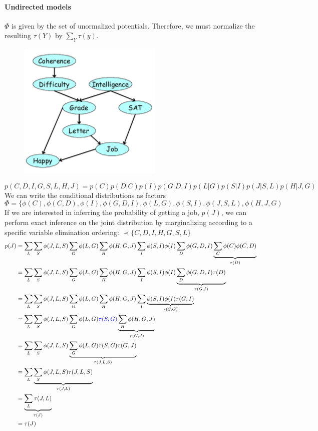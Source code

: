 \documentclass[11pt]{article}
\begin{document}
\paragraph{Undirected models}
$\Phi$ is given by the set of unormalized potentials. Therefore, we must normalize the resulting $\tau(Y)$ by $\sum_Y \tau(y)$.

 \begin{figure}[H]
	\centering
	\includegraphics[scale=0.6]{p1.png}
\end{figure}
$$p(C, D, I, G, S, L, H, J) = p(C)p(D|C)p(I)p(G|D,I)p(L|G)p(S|I)p(J|S,L)p(H|J,G)$$
We can write the conditional distributions as factors
$$\Phi = \{\phi(C), \phi(C, D), \phi(I), \phi(G,D,I), \phi(L,G), \phi(S, I), \phi(J, S, L), \phi(H, J, G)$$
If we are interested in inferring the probability of getting a job, $p(J)$, we can perform exact inference on the joint distribution by marginalizing according to a specific variable elimination ordering: $    \prec \{C, D, I, H, G, S, L\}$
\begin{align*}
	p(J) &=\sum_{L}\sum_{S} \phi(J,L,S) \sum_{G} \phi(L, G) \sum_{H}\phi(H,G,J)\sum_I \phi(S, I)\phi(I)\sum_D\phi(G,D,I)\underbrace{\sum_C\phi(C)\phi(C,D)}_{\tau{(D)}} \\
		 &=\sum_{L}\sum_{S} \phi(J,L,S) \sum_{G} \phi(L, G) \sum_{H}\phi(H,G,J)\sum_I \phi(S, I)\phi(I)\underbrace{\sum_D\phi(G,D,I)\tau(D)}_{\tau (G, I)} \\
		&=\sum_{L}\sum_{S} \phi(J,L,S) \sum_{G} \phi(L, G) \sum_{H}\phi(H,G,J)\sum_I \underbrace{\phi(S, I)\phi(I)\tau(G,I)}_{\tau(S,G)} \\
		&=\sum_{L}\sum_{S} \phi(J,L,S) \sum_{G} \phi(L, G)\textcolor{blue}{\tau(S,G)}\underbrace{\sum_{H}\phi(H,G,J)}_{\tau(G,J)}\\
		&=\sum_{L}\sum_{S} \phi(J,L,S) \underbrace{\sum_{G} \phi(L, G)\tau(S,G)\tau(G,J)}_{\tau(J,L,S)}\\		
		&=\sum_{L}\underbrace{\sum_{S} \phi(J,L,S)\tau(J,L,S)}_{\tau(J,L)}\\
		&=\underbrace{\sum_L \tau(J,L)}_{\tau(J)} \\
		&= \tau(J)
\end{align*}
\end{document}
